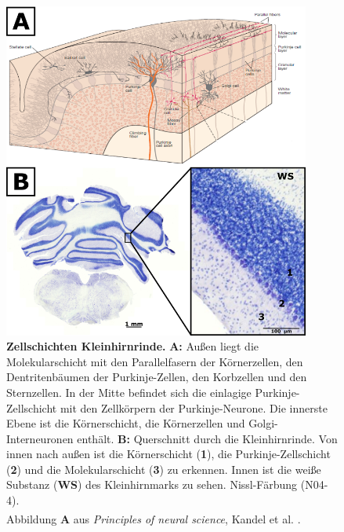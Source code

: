 \begin{figure}[H]
    \centering
    \includegraphics[width=0.9\textwidth]{pictures/Bilder_Laura/kleinhirn_schichten2.png}
    \caption[Zellschichten Kleinhirnrinde]{\textbf{Zellschichten Kleinhirnrinde.} \textbf{A:} Außen liegt die Molekularschicht mit den Parallelfasern der Körnerzellen, den Dentritenbäumen der Purkinje-Zellen, den Korbzellen und den Sternzellen. In der Mitte befindet sich die einlagige Purkinje-Zellschicht mit den Zellkörpern der Purkinje-Neurone. Die innerste Ebene ist die Körnerschicht, die Körnerzellen und Golgi-Interneuronen enthält. \textbf{B:} Querschnitt durch die Kleinhirnrinde. Von innen nach außen ist die Körnerschicht (\textbf{1}), die Purkinje-Zellschicht (\textbf{2}) und die Molekularschicht (\textbf{3}) zu erkennen. Innen ist die weiße Substanz (\textbf{WS}) des Kleinhirnmarks zu sehen. Nissl-Färbung (N04-4). \\ Abbildung \textbf{A} aus \textit{Principles of neural science}, Kandel et al. \textsuperscript{\cite[Kap.~42]{kandel2013principles}}.}
    \label{fig:schichten_kleinhirn}
\end{figure}

